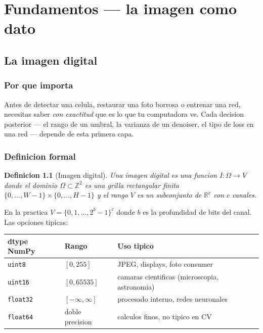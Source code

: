 \documentclass[11pt,a4paper,twoside,openright]{book}
\newtheorem{definicion}{Definicion}[chapter]
\begin{document}
\tableofcontents

\mainmatter

\part{Fundamentos --- la imagen como dato}

\chapter{La imagen digital}
\label{ch:imagen}

\section{Por que importa}

Antes de detectar una celula, restaurar una foto borrosa o entrenar una red, necesitas saber \emph{con exactitud} que es lo que tu computadora ve. Cada decision posterior --- el rango de un umbral, la varianza de un denoiser, el tipo de loss en una red --- depende de esta primera capa.

\section{Definicion formal}

\begin{definicion}[Imagen digital]
Una \emph{imagen digital} es una funcion $I: \Omega \to V$ donde el dominio $\Omega \subset \mathbb{Z}^2$ es una grilla rectangular finita $\{0, \dots, W{-}1\} \times \{0, \dots, H{-}1\}$ y el rango $V$ es un subconjunto de $\mathbb{R}^c$ con $c$ canales.
\end{definicion}

En la practica $V = \{0, 1, \dots, 2^{b}{-}1\}^c$ donde $b$ es la profundidad de bits del canal. Las opciones tipicas:

\begin{center}
\begin{tabular}{@{}lll@{}}
\toprule
\textbf{dtype NumPy} & \textbf{Rango} & \textbf{Uso tipico} \\
\midrule
\texttt{uint8}   & $[0, 255]$         & JPEG, displays, foto consumer \\
\texttt{uint16}  & $[0, 65535]$        & camaras cientificas (microscopia, astronomia) \\
\texttt{float32} & $[-\infty, \infty]$ & procesado interno, redes neuronales \\
\texttt{float64} & doble precision     & calculos finos, no tipico en CV \\
\bottomrule
\end{tabular}
\end{center}
\end{document}
